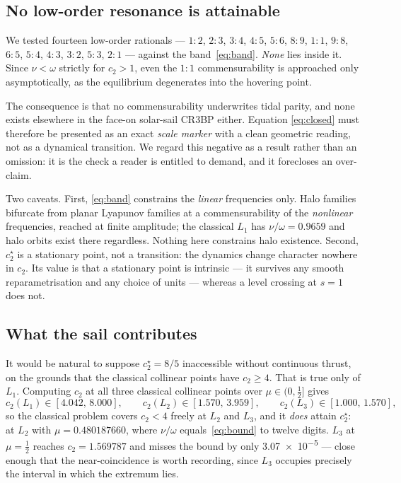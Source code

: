 \documentclass[11pt,a4paper]{article}
\begin{document}
\subsection{No low-order resonance is attainable}

We tested fourteen low-order rationals --- $1{:}2$, $2{:}3$, $3{:}4$, $4{:}5$,
$5{:}6$, $8{:}9$, $1{:}1$, $9{:}8$, $6{:}5$, $5{:}4$, $4{:}3$, $3{:}2$,
$5{:}3$, $2{:}1$ --- against the band~\eqref{eq:band}. \emph{None} lies inside
it. Since $\nu<\omega$ strictly for $c_2>1$, even the $1{:}1$ commensurability is
approached only asymptotically, as the equilibrium degenerates into the hovering
point.

The consequence is that no commensurability underwrites tidal parity, and none
exists elsewhere in the face-on solar-sail CR3BP either. Equation
\eqref{eq:closed} must therefore be presented as an exact \emph{scale marker}
with a clean geometric reading, not as a dynamical transition. We regard this
negative as a result rather than an omission: it is the check a reader is
entitled to demand, and it forecloses an over-claim.

Two caveats. First, \eqref{eq:band} constrains the \emph{linear} frequencies
only. Halo families bifurcate from planar Lyapunov families at a
commensurability of the \emph{nonlinear} frequencies, reached at finite
amplitude; the classical $L_1$ has $\nu/\omega=0.9659$ and halo orbits exist
there regardless. Nothing here constrains halo existence.
Second, $c_2^\star$ is a stationary point, not a transition: the dynamics change
character nowhere in $c_2$. Its value is that a stationary point is intrinsic ---
it survives any smooth reparametrisation and any choice of units --- whereas a
level crossing at $s=1$ does not.

\subsection{What the sail contributes}

It would be natural to suppose $c_2^\star=8/5$ inaccessible without continuous
thrust, on the grounds that the classical collinear points have $c_2\geq4$. That
is true only of $L_1$. Computing $c_2$ at all three classical collinear points
over $\mu\in(0,\tfrac12]$ gives
\begin{equation}
  c_2(L_1)\in[4.042,\,8.000], \qquad
  c_2(L_2)\in[1.570,\,3.959], \qquad
  c_2(L_3)\in[1.000,\,1.570],
\end{equation}
so the classical problem covers $c_2<4$ freely at $L_2$ and $L_3$, and it
\emph{does} attain $c_2^\star$: at $L_2$ with $\mu=0.480187660$, where
$\nu/\omega$ equals~\eqref{eq:bound} to twelve digits. $L_3$ at $\mu=\tfrac12$
reaches $c_2=1.569787$ and misses the bound by only \num{3.07e-5} --- close
enough that the near-coincidence is worth recording, since $L_3$ occupies
precisely the interval in which the extremum lies.
\end{document}
